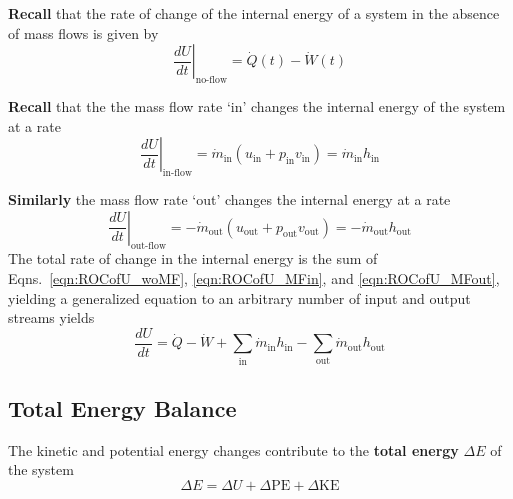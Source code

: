 \textbf{Recall} that the rate of change of the internal energy of a system in the absence of mass flows is given by
\begin{equation}
\label{eqn:ROCofU_woMF}
\left.\frac{dU}{dt}\right|_{\text{no-flow}}=\dot{Q}(t)-\dot{W}(t)
\end{equation}
\vspace{12 pt}

\textbf{Recall} that the the mass flow rate `in' changes the internal energy of the system at a rate
\begin{equation}
\label{eqn:ROCofU_MFin}
\left.\frac{dU}{dt}\right|_{\text{in-flow}}=\dot{m}_{\text{in}}(u_{\text{in}}+p_{\text{in}}v_{\text{in}})=\dot{m}_{\text{in}}h_{\text{in}}
\end{equation}
\vspace{12 pt}

\textbf{Similarly} the mass flow rate `out' changes the internal energy at a rate
\begin{equation}
\label{eqn:ROCofU_MFout}
\left.\frac{dU}{dt}\right|_{\text{out-flow}}=-\dot{m}_{\text{out}}(u_{\text{out}}+p_{\text{out}}v_{\text{out}})=-\dot{m}_{\text{out}}h_{\text{out}}
\end{equation}
The total rate of change in the internal energy is the sum of Eqns.~\ref{eqn:ROCofU_woMF}, \ref{eqn:ROCofU_MFin}, and \ref{eqn:ROCofU_MFout}, yielding a generalized equation
to an arbitrary number of input and output streams yields
\begin{equation}
  \frac{dU}{dt}=\dot{Q}-\dot{W}+\sum_{\text{in}}\dot{m}_{\text{in}}h_{\text{in}}-\sum_{\text{out}}\dot{m}_{\text{out}}h_{\text{out}}  
\end{equation}
\subsection{Total Energy Balance}
The kinetic and potential energy changes contribute to the \textbf{total energy} $\Delta E$ of the system
\begin{equation}
\Delta E=\Delta U+ \Delta \text{PE}+ \Delta \text{KE}
\end{equation}

